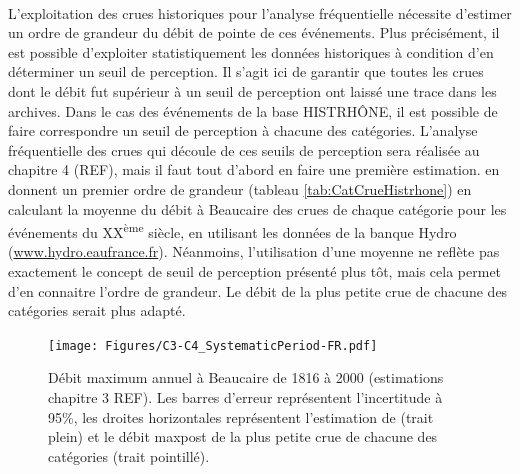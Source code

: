 \documentclass[11pt]{article}
\begin{document}
	\paragraph{} L'exploitation des crues historiques pour l'analyse fréquentielle nécessite d'estimer un ordre de grandeur du débit de pointe de ces événements. Plus précisément, il est possible d'exploiter statistiquement les données historiques à condition d'en déterminer un seuil de perception. Il s'agit ici de garantir que toutes les crues dont le débit fut supérieur à un seuil de perception ont laissé une trace dans les archives. Dans le cas des événements de la base HISTRHÔNE, il est possible de faire correspondre un seuil de perception à chacune des catégories. L'analyse fréquentielle des crues qui découle de ces seuils de perception sera réalisée au chapitre 4 (REF), mais il faut tout d'abord en faire une première estimation. \citet{pichard_hydro-climatology_2017} en donnent un premier ordre de grandeur (tableau \ref{tab:CatCrueHistrhone}) en calculant la moyenne du débit à Beaucaire des crues de chaque catégorie pour les événements du XX\textsuperscript{ème} siècle, en utilisant les données de la banque Hydro (\url{www.hydro.eaufrance.fr}). Néanmoins, l'utilisation d'une moyenne ne reflète pas exactement le concept de seuil de perception présenté plus tôt, mais cela permet d'en connaitre l'ordre de grandeur. Le débit de la plus petite crue de chacune des catégories serait plus adapté. 
	
	\begin{figure}[h]
	\centering
		\texttt{[image: Figures/C3-C4\_SystematicPeriod-FR.pdf]}
        \caption{Débit maximum annuel à Beaucaire de 1816 à 2000 (estimations chapitre 3 REF). Les barres d'erreur représentent l'incertitude à 95\%, les droites horizontales représentent l'estimation de \citet{pichard_hydro-climatology_2017} (trait plein) et le débit maxpost de la plus petite crue de chacune des catégories (trait pointillé).}
		\label{fig:C3-C4_Syst}
	\end{figure}
		
	
\end{document}
